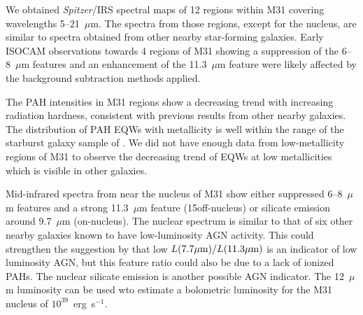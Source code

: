 We  obtained {\em Spitzer}/IRS spectral maps of 12 regions within M31 covering wavelengths 5--21~$\mu$m. 
The spectra from those regions, except for the nucleus, are similar to spectra obtained from other nearby  star-forming galaxies. 
Early  ISOCAM observations  towards 4 regions of M31 showing a suppression 
of the 6--8~$\mu$m features and an enhancement of  the 11.3~$\mu$m feature  \citep{1998Cesarsky} 
were likely affected by the background subtraction methods applied.

The PAH intensities in M31 regions show a decreasing trend with increasing radiation hardness, consistent with previous 
results from other nearby galaxies. The distribution of PAH EQWs with metallicity is well within the range of the starburst galaxy sample of \citet{Engelbracht_2008}. 
We did not have enough data from low-metallicity regions of M31 to observe the decreasing trend of EQWs at low metallicities which is visible in other galaxies.

Mid-infrared spectra from near the nucleus of M31 show either suppressed 6--8~$\mu$m features and a strong 11.3~$\mu$m feature
(15\arcsec off-nucleus) or silicate emission around 9.7~$\mu$m  (on-nucleus). 
The nuclear spectrum is similar to that of six other nearby galaxies known to have low-luminosity AGN activity. This could strengthen the
suggestion by \citet{Smith:2007lr} that low $L(7.7\mu{\rm m})/L(11.3\mu{\rm m})$ is an indicator of low luminosity AGN,
but this feature ratio could also be due to a lack of ionized PAHs. The nuclear silicate emission is another possible AGN indicator.
The 12~$\mu$m luminosity can be used wto estimate a bolometric luminosity for the M31 nucleus of $10^{39}$~erg~s$^{-1}$.
